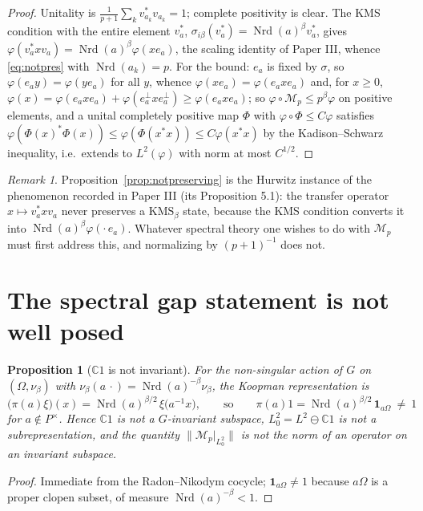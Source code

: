 \documentclass[11pt]{amsart}
\numberwithin{equation}{section}
\newtheorem{proposition}[theorem]{Proposition}
\theoremstyle{definition}
\theoremstyle{remark}
\newtheorem{remark}[theorem]{Remark}
\newcommand{\C}{\mathbb{C}}
\newcommand{\cM}{\mathcal{M}}
\newcommand{\Nrd}{\operatorname{Nrd}}
\begin{document}
\begin{proof}
Unitality is $\frac1{p+1}\sum_kv_{a_k}^*v_{a_k}=1$; complete positivity is clear. The KMS
condition with the entire element $v_a^*$, $\sigma_{i\beta}(v_a^*)=\Nrd(a)^{\beta}v_a^*$,
gives $\varphi(v_a^*xv_a)=\Nrd(a)^{\beta}\varphi(xe_a)$, the scaling identity of Paper III,
whence \eqref{eq:notpres} with $\Nrd(a_k)=p$. For the bound: $e_a$ is fixed by $\sigma$, so
$\varphi(e_ay)=\varphi(ye_a)$ for all $y$, whence $\varphi(xe_a)=\varphi(e_axe_a)$ and, for
$x\ge0$, $\varphi(x)=\varphi(e_axe_a)+\varphi(e_a^\perp xe_a^\perp)\ge\varphi(e_axe_a)$; so
$\varphi\circ\cM_p\le p^{\beta}\varphi$ on positive elements, and a unital completely positive
map $\Phi$ with $\varphi\circ\Phi\le C\varphi$ satisfies
$\varphi(\Phi(x)^*\Phi(x))\le\varphi(\Phi(x^*x))\le C\varphi(x^*x)$ by the Kadison--Schwarz
inequality, i.e.\ extends to $L^2(\varphi)$ with norm at most $C^{1/2}$.
\end{proof}

\begin{remark}\label{rem:sameas}
Proposition~\ref{prop:notpreserving} is the Hurwitz instance of the phenomenon recorded in
Paper III (its Proposition 5.1): the transfer operator $x\mapsto v_a^*xv_a$ never preserves a
$\mathrm{KMS}_\beta$ state, because the KMS condition converts it into
$\Nrd(a)^\beta\varphi(\cdot\,e_a)$. Whatever spectral theory one wishes to do with $\cM_p$
must first address this, and normalizing by $(p+1)^{-1}$ does not.
\end{remark}

\section{The spectral gap statement is not well posed}

\begin{proposition}[$\C1$ is not invariant]\label{prop:notinvariant}
For the non-singular action of $G$ on $(\Omega,\nu_\beta)$ with
$\nu_\beta(a\,\cdot)=\Nrd(a)^{-\beta}\nu_\beta$, the Koopman representation is
\[
\bigl(\pi(a)\xi\bigr)(x)=\Nrd(a)^{\beta/2}\,\xi\bigl(a^{-1}x\bigr),
\qquad\text{so}\qquad
\pi(a)1=\Nrd(a)^{\beta/2}\,\mathbf 1_{a\Omega}\ \ne\ 1
\]
for $a\notin P^\times$. Hence $\C1$ is not a $G$-invariant subspace, $L^2_0=L^2\ominus\C1$ is
not a subrepresentation, and the quantity $\|\cM_p|_{L^2_0}\|$ is not the norm of an operator
on an invariant subspace.
\end{proposition}

\begin{proof}
Immediate from the Radon--Nikodym cocycle; $\mathbf 1_{a\Omega}\ne1$ because $a\Omega$ is a
proper clopen subset, of measure $\Nrd(a)^{-\beta}<1$.
\end{proof}
\end{document}
